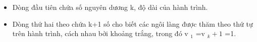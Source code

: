 \begin{itemize}
	\item     Dòng đầu tiên chứa số nguyên dương k, độ dài của hành trình.   
	\item     Dòng thứ hai theo chứa k+1 số cho biết các ngôi làng được thăm theo thứ tự trên hành trình, cách nhau bởi khoảng trắng, trong đó v    $_     1    $    =v    $_     k+1    $    =1.   
\end{itemize}

\
